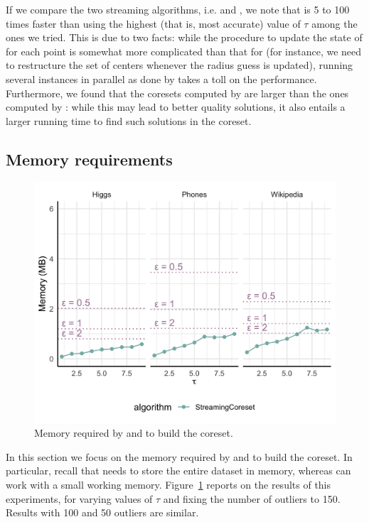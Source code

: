 If we compare the two streaming algorithms, i.e. \stream and \kale, we note that
\stream is 5 to 100 times faster than \kale using the highest (that is, most
accurate) value of $\tau$ among the ones we tried.  This is due to two facts:
while the procedure to update the state of \stream for each point is somewhat
more complicated than that for \kale (for instance, we need to restructure the
set of centers whenever the radius guess is updated), running several instances
in parallel as done by \kale takes a toll on the performance.  Furthermore, we
found that the coresets computed by \kale are larger than the ones computed by
\stream: while this may lead to better quality solutions, it also entails a
larger running time to find such solutions in the coreset.


\subsection{Memory requirements}
\label{sec:memory}


\begin{figure}
    \includegraphics[width=\columnwidth]{memory-50}
    \caption{\label{fig:memory}Memory required by \stream and \seq to build the coreset.}
\end{figure}

In this section we focus on the memory required by \seq and \stream to build the
coreset.
In particular, recall that \seq needs to store the entire dataset in memory, whereas \stream 
can work with a small working memory.
Figure~\ref{fig:memory} reports on the results of this experiments, for varying values of $\tau$
and fixing the number of outliers to 150.
Results with 100 and 50 outliers are similar.



